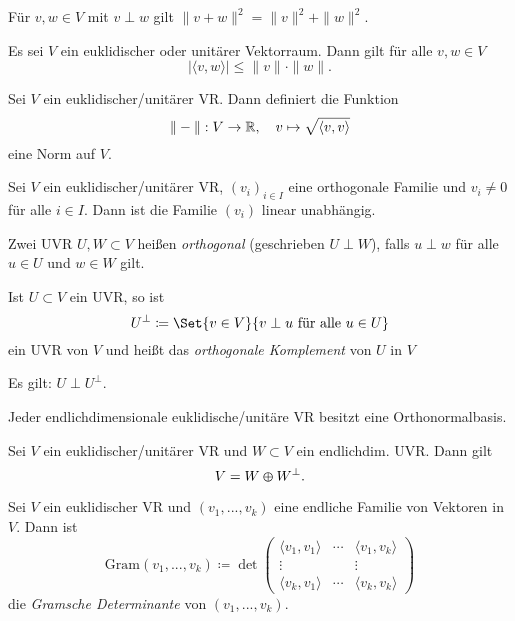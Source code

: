 \documentclass{cheat-sheet}
\newcommand{\Gram}{\mathrm{Gram}}
\begin{document}
\begin{satz}
Für $v, w \in V$ mit $v \perp w$ gilt $\| v + w \|^2 = \| v \|^2 + \| w \|^2$.
\end{satz}

\begin{satz}
Es sei $V$ ein euklidischer oder unitärer Vektorraum. Dann gilt für alle $v, w \in V$
\[ | \langle v, w \rangle | \le \| v \| \cdot \| w \|. \]
\end{satz}

\begin{satz}
Sei $V$ ein euklidischer/unitärer VR. Dann definiert die Funktion
\[ \| - \| : V \to \mathbb{R}, \quad v \mapsto \sqrt{ \langle v , v \rangle } \]
eine Norm auf $V$.
\end{satz}

\begin{satz}
Sei $V$ ein euklidischer/unitärer VR, $(v_i)_{i \in I}$ eine orthogonale Familie und $v_i \not= 0$ für alle $i \in I$. Dann ist die Familie $(v_i)$ linear unabhängig.
\end{satz}

\begin{definition}
Zwei UVR $U, W \subset V$ heißen \emph{orthogonal} (geschrieben $U \perp W$), falls $u \perp w$ für alle $u \in U$ und $w \in W$ gilt.
\end{definition}

\begin{definition}
Ist $U \subset V$ ein UVR, so ist
\[ U^{\perp} \coloneqq \Set{ v \in V }{ v \perp u \text{ für alle } u \in U } \]
ein UVR von $V$ und heißt das \emph{orthogonale Komplement} von $U$ in $V$
\end{definition}

\begin{bem}
Es gilt: $U \perp U^{\perp}$.
\end{bem}

\begin{satz}
Jeder endlichdimensionale euklidische/unitäre VR besitzt eine Orthonormalbasis.
\end{satz}


 \begin{kor}
 Sei $V$ ein euklidischer/unitärer VR und $W \subset V$ ein endlichdim. UVR. Dann gilt
 \[ V = W \varoplus W^{\perp}. \]
 \end{kor}

\begin{definition}
Sei $V$ ein euklidischer VR und $(v_1, ..., v_k)$ eine endliche Familie von Vektoren in $V$. Dann ist
\[ \Gram(v_1, ..., v_k) \coloneqq \det \begin{pmatrix}
\langle v_1 , v_1 \rangle & \cdots & \langle v_1 , v_k \rangle \\
\vdots & & \vdots \\
\langle v_k , v_1 \rangle & \cdots & \langle v_k , v_k \rangle
\end{pmatrix} \]
die \emph{Gramsche Determinante} von $(v_1, ..., v_k)$.
\end{definition}
\end{document}
